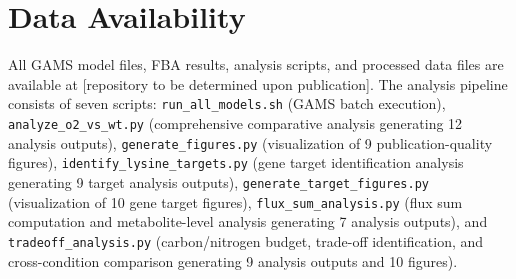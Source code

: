 \documentclass[12pt,a4paper]{article}
\begin{document}
\section*{Data Availability}

All GAMS model files, FBA results, analysis scripts, and processed data files are available at [repository to be determined upon publication]. The analysis pipeline consists of seven scripts: \texttt{run\_all\_models.sh} (GAMS batch execution), \texttt{analyze\_o2\_vs\_wt.py} (comprehensive comparative analysis generating 12 analysis outputs), \texttt{generate\_figures.py} (visualization of 9 publication-quality figures), \texttt{identify\_lysine\_targets.py} (gene target identification analysis generating 9 target analysis outputs), \texttt{generate\_target\_figures.py} (visualization of 10 gene target figures), \texttt{flux\_sum\_analysis.py} (flux sum computation and metabolite-level analysis generating 7 analysis outputs), and \texttt{tradeoff\_analysis.py} (carbon/nitrogen budget, trade-off identification, and cross-condition comparison generating 9 analysis outputs and 10 figures).


\end{document}
